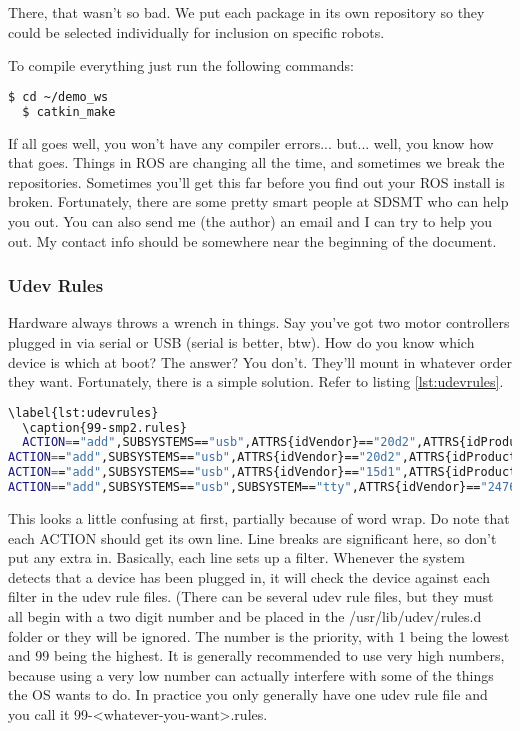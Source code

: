 There, that wasn't so bad. We put each package in its own repository so they could be selected individually for inclusion on specific robots.

To compile everything just run the following commands:

\begin{lstlisting}[language=bash]
  $ cd ~/demo_ws
  $ catkin_make
\end{lstlisting}

If all goes well, you won't have any compiler errors... but... well, you know how that goes. Things in ROS are changing all the time, and sometimes we break the repositories. Sometimes you'll get this far before you find out your ROS install is broken. Fortunately, there are some pretty smart people at SDSMT who can help you out. You can also send me (the author) an email and I can try to help you out. My contact info should be somewhere near the beginning of the document.

\subsubsection{Udev Rules}

Hardware always throws a wrench in things. Say you've got two motor controllers plugged in via serial or USB (serial is better, btw). How do you know which device is which at boot? The answer? You don't. They'll mount in whatever order they want. Fortunately, there is a simple solution. Refer to listing \ref{lst:udevrules}.

\begin{lstlisting}[language=bash]
  \label{lst:udevrules}
  \caption{99-smp2.rules}
  ACTION=="add",SUBSYSTEMS=="usb",ATTRS{idVendor}=="20d2",ATTRS{idProduct}=="5740",ATTRS{serial}=="498326853235",SYMLINK+="robot/left_motor_controller",MODE="0666"
ACTION=="add",SUBSYSTEMS=="usb",ATTRS{idVendor}=="20d2",ATTRS{idProduct}=="5740",ATTRS{serial}=="498626953235",SYMLINK+="robot/right_motor_controller",MODE="0666"
ACTION=="add",SUBSYSTEMS=="usb",ATTRS{idVendor}=="15d1",ATTRS{idProduct}=="0000",SYMLINK+="robot/lidar",MODE="0666"
ACTION=="add",SUBSYSTEMS=="usb",SUBSYSTEM=="tty",ATTRS{idVendor}=="2476",ATTRS{idProduct}=="1010",SYMLINK="robot/imu",MODE="0666"
\end{lstlisting}

This looks a little confusing at first, partially because of word wrap. Do note that each ACTION should get its own line. Line breaks are significant here, so don't put any extra in. Basically, each line sets up a filter. Whenever the system detects that a device has been plugged in, it will check the device against each filter in the udev rule files. (There can be several udev rule files, but they must all begin with a two digit number and be placed in the /usr/lib/udev/rules.d folder or they will be ignored. The number is the priority, with 1 being the lowest and 99 being the highest. It is generally recommended to use very high numbers, because using a very low number can actually interfere with some of the things the OS wants to do. In practice you only generally have one udev rule file and you call it 99-<whatever-you-want>.rules.

